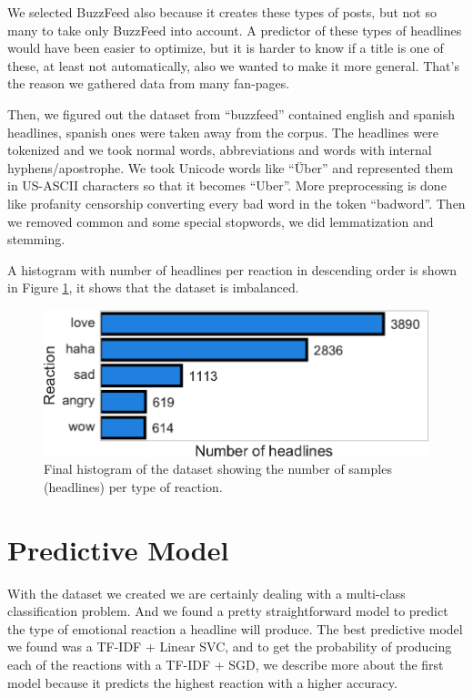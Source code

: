 \documentclass[11pt]{article}
\begin{document}
We selected BuzzFeed also because it creates these types of posts, but not so many to take only BuzzFeed into account. A predictor of these types of headlines would have been easier to optimize, but it is harder to know if a title is one of these, at least not automatically, also we wanted to make it more general. That's the reason we gathered data from many fan-pages.

Then, we figured out the dataset from ``buzzfeed'' contained english and spanish headlines, spanish ones were taken away from the corpus. The headlines were tokenized and we took normal words, abbreviations and words with internal hyphens/apostrophe. We took Unicode words like ``Über'' and represented them in US-ASCII characters so that it becomes ``Uber''. More preprocessing is done like profanity censorship converting every bad word in the token ``badword''. Then we removed common and some special stopwords, we did lemmatization and stemming.

A histogram with number of headlines per reaction in descending order is shown in Figure \ref{fig:hist}, it shows that the dataset is imbalanced.

\begin{figure}[ht!]
\centering
\includegraphics[width=1.0\columnwidth]{../3_notebooks/notebook_figures/histogram_reactions.pdf}
\caption{Final histogram of the dataset showing the number of samples (headlines) per type of reaction.}
\label{fig:hist}
\end{figure}


\section{Predictive Model} 

With the dataset we created we are certainly dealing with a multi-class classification problem. And we found a pretty straightforward model to predict the type of emotional reaction a headline will produce. The best predictive model we found was a TF-IDF + Linear SVC, and to get the probability of producing each of the reactions with a TF-IDF + SGD, we describe more about the first model because it predicts the highest reaction with a higher accuracy.
\end{document}
